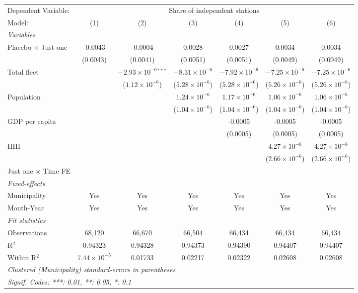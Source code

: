 \documentclass[
]{article}
\begin{document}
\begin{tabular}{lcccccc}
\tabularnewline\midrule\midrule
Dependent Variable:&\multicolumn{6}{c}{Share of independent stations}\\
Model:&(1) & (2) & (3) & (4) & (5) & (6)\\
\midrule \emph{Variables}&   &   &   &   &   &  \\
Placebo $\times $ Just one & -0.0043 & -0.0004 & 0.0028 & 0.0027 & 0.0034 & 0.0034\\
  &(0.0043) & (0.0041) & (0.0051) & (0.0051) & (0.0049) & (0.0049)\\
Total fleet &    & $-2.93\times 10^{-6}$$^{***}$ & $-8.31\times 10^{-6}$ & $-7.92\times 10^{-6}$ & $-7.25\times 10^{-6}$ & $-7.25\times 10^{-6}$\\
  &   & ($1.12\times 10^{-6}$) & ($5.28\times 10^{-6}$) & ($5.28\times 10^{-6}$) & ($5.26\times 10^{-6}$) & ($5.26\times 10^{-6}$)\\
Population &    &    & $1.24\times 10^{-6}$ & $1.17\times 10^{-6}$ & $1.06\times 10^{-6}$ & $1.06\times 10^{-6}$\\
  &   &    & ($1.04\times 10^{-6}$) & ($1.04\times 10^{-6}$) & ($1.04\times 10^{-6}$) & ($1.04\times 10^{-6}$)\\
GDP per capita &    &    &    & -0.0005 & -0.0005 & -0.0005\\
  &   &    &    & (0.0005) & (0.0005) & (0.0005)\\
HHI &    &    &    &    & $4.27\times 10^{-6}$ & $4.27\times 10^{-6}$\\
  &   &    &    &    & ($2.66\times 10^{-6}$) & ($2.66\times 10^{-6}$)\\
Just one $\times$ Time FE &  &  &  &  &  & \\
\midrule \emph{Fixed-effects}&   &   &   &   &   &  \\
Municipality & Yes & Yes & Yes & Yes & Yes & Yes\\
Month-Year & Yes & Yes & Yes & Yes & Yes & Yes\\
\midrule \emph{Fit statistics}&  & & & & & \\
Observations & 68,120&66,670&66,504&66,434&66,434&66,434\\
R$^2$ & 0.94323&0.94328&0.94373&0.94390&0.94407&0.94407\\
Within R$^2$ & $7.44\times 10^{-5}$&0.01733&0.02217&0.02322&0.02608&0.02608\\
\midrule\midrule\multicolumn{7}{l}{\emph{Clustered (Municipality) standard-errors in parentheses}}\\
\multicolumn{7}{l}{\emph{Signif. Codes: ***: 0.01, **: 0.05, *: 0.1}}\\
\end{tabular}
\end{document}

